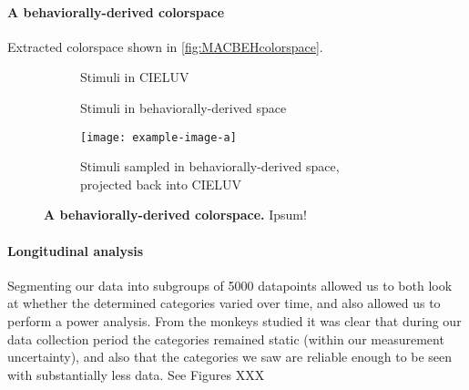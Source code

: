 \paragraph{A behaviorally-derived colorspace}

Extracted colorspace shown in \autoref{fig:MACBEHcolorspace}.

\begin{figure}
    \centering
    \begin{subfigure}[b]{0.3\textwidth}
         \centering
         \caption{Stimuli in CIELUV \newline\newline}
         
         \label{fig:CIELUV}
    \end{subfigure}
    \hfill
    \begin{subfigure}[b]{0.3\textwidth}
         \centering
         \caption{Stimuli in behaviorally-derived space \newline}
         
         \label{fig:MACBEHspace}
    \end{subfigure}
    \hfill
    \begin{subfigure}[b]{0.3\textwidth}
         \centering
         \caption{Stimuli sampled in behaviorally-derived space, projected back into CIELUV}
         \texttt{[image: example-image-a]}
         \label{fig:UniformStimsInCIELUV}
    \end{subfigure}
           \caption{\textbf{A behaviorally-derived colorspace.} Ipsum!}
        \label{fig:MACBEHcolorspace}
    
\end{figure}

\paragraph{Longitudinal analysis}

Segmenting our data into subgroups of 5000 datapoints allowed us to both look at whether the determined categories varied over time, and also allowed us to perform a power analysis. From the monkeys studied it was clear that during our data collection period the categories remained static (within our measurement uncertainty), and also that the categories we saw are reliable enough to be seen with substantially less data. See Figures XXX %
